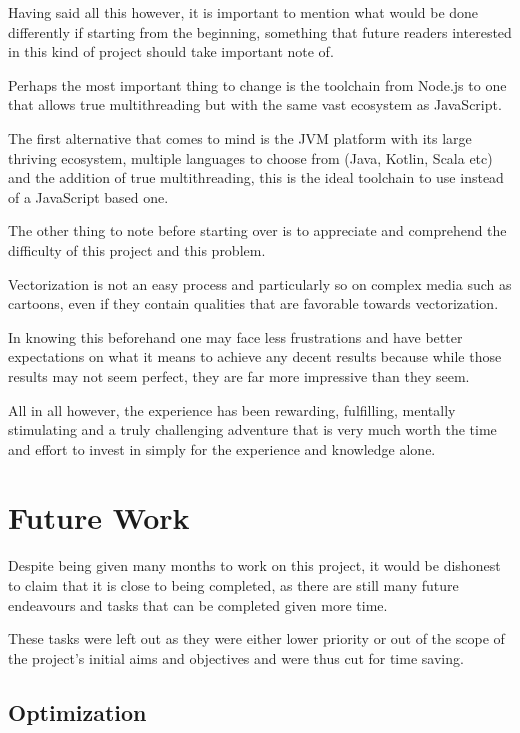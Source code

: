 \documentclass[12pt]{article}
\newcommand{\sentence}{} %
\begin{document}
    \bigskip
    Having said all this however, it is important to mention what would be done differently if starting from the
    beginning, something that future readers interested in this kind of project should take important note of.
    \sentence
    Perhaps the most important thing to change is the toolchain from Node.js to one that allows true multithreading
    but with the same vast ecosystem as JavaScript.
    \sentence
    The first alternative that comes to mind is the JVM platform with its large thriving ecosystem, multiple languages
    to choose from (Java, Kotlin, Scala etc) and the addition of true multithreading, this is the ideal toolchain to
    use instead of a JavaScript based one.
    \sentence
    The other thing to note before starting over is to appreciate and comprehend the difficulty of this project and
    this problem.
    \sentence
    Vectorization is not an easy process and particularly so on complex media such as cartoons, even if they contain
    qualities that are favorable towards vectorization.
    \sentence
    In knowing this beforehand one may face less frustrations and have better expectations on what it means to achieve any
    decent results because while those results may not seem perfect, they are far more impressive than they seem.
    \sentence
    All in all however, the experience has been rewarding, fulfilling, mentally stimulating and a truly challenging
    adventure that is very much worth the time and effort to invest in simply for the experience and knowledge alone.

    \pagebreak


    \section{Future Work}\label{sec:future-work}

    \tab
    Despite being given many months to work on this project, it would be dishonest to claim that it is close to being
    completed, as there are still many future endeavours and tasks that can be completed given more time.
    \sentence
    These tasks were left out as they were either lower priority or out of the scope of the project's initial aims
    and objectives and were thus cut for time saving.
    \sentence

    \subsection{Optimization}\label{subsec:optimization}
\end{document}
